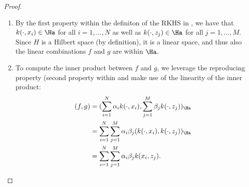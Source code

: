 \begin{proof}
\begin{enumerate}
\item By the first property within the definiton of the RKHS in , 
we have that $k(\cdot, x_i) \in \Ha$ for all $i=1, ..., N$ as well as $k(\cdot, z_j) \in \Ha$ for all $j = 1, ..., M$.
Since $H$ is a Hilbert space (by definition), it is a linear space, 
and thus also the linear combinations $f$ and $g$ are within $\Ha$.
\item To compute the inner product between $f$ and $g$, we leverage the reproducing property (second property within  and make use of the linearity of the inner product:
\begin{align*}
(f, g) &= (\sum_{i=1}^N \alpha_i k(\cdot, x_i), \sum_{j=1}^M \beta_j k(\cdot, z_j))_{\Ha} \\
&= \sum_{i=1}^N \sum_{j=1}^M \alpha_i \beta_j (k(\cdot, x_i),  k(\cdot, z_j))_{\Ha} \\
&= \sum_{i=1}^N \sum_{j=1}^M \alpha_i \beta_j k(x_i, z_j).
\end{align*}
\end{enumerate}

\end{proof}




%
%
%
%
%




